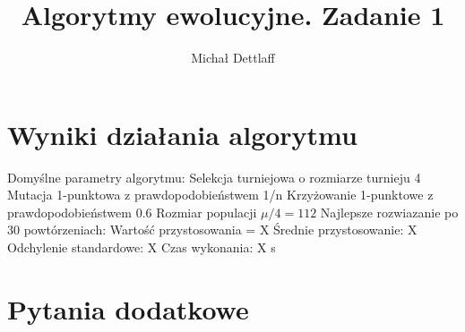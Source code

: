 \documentclass[11pt]{article}
\begin{document}
\title{Algorytmy ewolucyjne. Zadanie 1}
\author{Michał Dettlaff}
\maketitle

\section{Wyniki działania algorytmu}

\noindent
Domyślne parametry algorytmu:\newline
Selekcja turniejowa o rozmiarze turnieju 4\newline
Mutacja 1-punktowa z prawdopodobieństwem 1/n\newline
Krzyżowanie 1-punktowe z prawdopodobieństwem 0.6\newline
Rozmiar populacji $ \mu/4 = 112 $\newline
\newline
Najlepsze rozwiazanie po 30 powtórzeniach:\newline
Wartość przystosowania = X\newline
Średnie przystosowanie: X\newline
Odchylenie standardowe: X\newline
Czas wykonania: X s

\section{Pytania dodatkowe}
\end{document}
